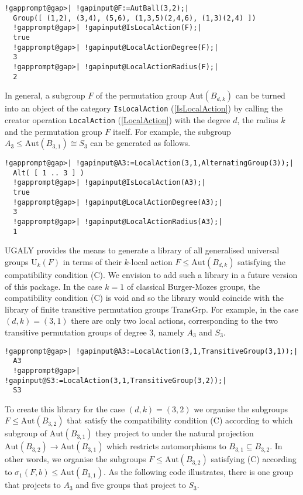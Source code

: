 \documentclass[a4paper,11pt]{report}
\begin{document}
{{ 
\begin{Verbatim}[commandchars=!@|,fontsize=\small,frame=single,label=Example]
  !gapprompt@gap>| !gapinput@F:=AutBall(3,2);|
  Group([ (1,2), (3,4), (5,6), (1,3,5)(2,4,6), (1,3)(2,4) ])
  !gapprompt@gap>| !gapinput@IsLocalAction(F);|
  true
  !gapprompt@gap>| !gapinput@LocalActionDegree(F);|
  3
  !gapprompt@gap>| !gapinput@LocalActionRadius(F);|
  2
\end{Verbatim}
 In general, a subgroup $F$ of the permutation group $\mathrm{Aut}(B_{d,k})$ can be turned into an object of the category \texttt{IsLocalAction} (\ref{IsLocalAction}) by calling the creator operation \texttt{LocalAction} (\ref{LocalAction}) with the degree $d$, the radius $k$ and the permutation group $F$ itself. For example, the subgroup $A_{3}\le\mathrm{Aut}(B_{3,1})\cong S_{3}$ can be generated as follows. 

 
\begin{Verbatim}[commandchars=!@|,fontsize=\small,frame=single,label=Example]
  !gapprompt@gap>| !gapinput@A3:=LocalAction(3,1,AlternatingGroup(3));|
  Alt( [ 1 .. 3 ] )
  !gapprompt@gap>| !gapinput@IsLocalAction(A3);|
  true
  !gapprompt@gap>| !gapinput@LocalActionDegree(A3);|
  3
  !gapprompt@gap>| !gapinput@LocalActionRadius(A3);|
  1
\end{Verbatim}
 \textsf{UGALY} provides the means to generate a library of all generalised universal groups $\mathrm{U}_{k}(F)$ in terms of their $k$-local action $F\le\mathrm{Aut}(B_{d,k})$ satisfying the compatibility condition (C). We envision to add such a library
in a future version of this package. In the case $k=1$ of classical Burger-Mozes groups, the compatibility condition (C) is void and
so the library would coincide with the library of finite transitive
permutation groups \textsf{TransGrp}. For example, in the case $(d,k)=(3,1)$ there are only two local actions, corresponding to the two transitive
permutation groups of degree $3$, namely $A_{3}$ and $S_{3}$. 

 
\begin{Verbatim}[commandchars=!@|,fontsize=\small,frame=single,label=Example]
  !gapprompt@gap>| !gapinput@A3:=LocalAction(3,1,TransitiveGroup(3,1));|
  A3
  !gapprompt@gap>| !gapinput@S3:=LocalAction(3,1,TransitiveGroup(3,2));|
  S3
\end{Verbatim}
 To create this library for the case $(d,k)=(3,2)$ we organise the subgroups $F\le\mathrm{Aut}(B_{3,2})$ that satisfy the compatibility condition (C) according to which subgroup of $\mathrm{Aut}(B_{3,1})$ they project to under the natural projection $\mathrm{Aut}(B_{3,2})\to\mathrm{Aut}(B_{3,1})$ which restricts automorphisms to $B_{3,1}\subseteq B_{3,2}$. In other words, we organise the subgroups $F\le\mathrm{Aut}(B_{3,2})$ satisfying (C) according to $\sigma_{1}(F,b)\le\mathrm{Aut}(B_{3,1})$. As the following code illustrates, there is one group that projects to $A_{3}$ and five groups that project to $S_{3}$. 

}}
\end{document}
